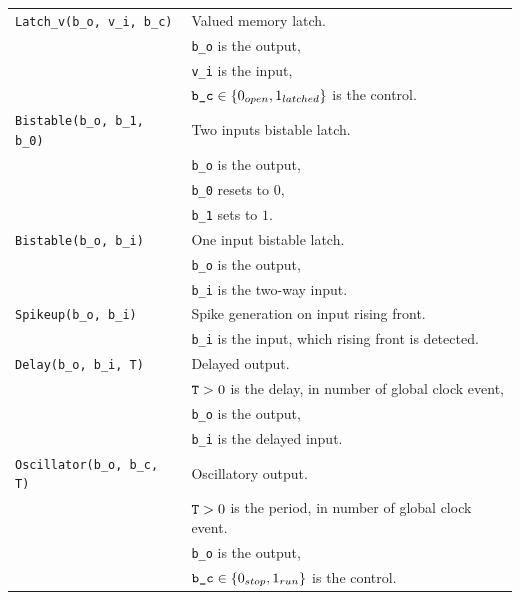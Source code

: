 \documentclass[a4]{article}
\begin{document}
{\begin{tabular}{ll}
  {\tt Latch\_v(b\_o, v\_i, b\_c)} & Valued memory latch. \\& {\tt b\_o} is the  output, \\& {\tt v\_i} is the input,  \\& $\mbox{{\tt b\_c}} \in \{0_{open}, 1_{latched}\}$ is the control. \\
  {\tt Bistable(b\_o, b\_1, b\_0)} & Two inputs bistable latch. \\& {\tt b\_o} is the  output, \\& {\tt b\_0} resets to $0$, \\& {\tt b\_1} sets to $1$. \\
  {\tt Bistable(b\_o, b\_i)} & One input bistable latch. \\& {\tt b\_o} is the  output, \\& {\tt b\_i} is the two-way input.\\
  {\tt Spikeup(b\_o, b\_i)} & Spike generation on input rising front. \\& {\tt b\_i} is the input, which rising front is detected.\\
  {\tt Delay(b\_o, b\_i, T)} & Delayed output. \\& $\mbox{{\tt T}} > 0$ is the delay, in number of global clock event, \\& {\tt b\_o} is the  output, \\& {\tt b\_i} is the delayed input.\\
  {\tt Oscillator(b\_o, b\_c, T)} & Oscillatory output. \\& $\mbox{{\tt T}} > 0$ is the period, in number of global clock event. \\& {\tt b\_o} is the  output, \\& $\mbox{{\tt b\_c}} \in \{0_{stop}, 1_{run}\}$ is the control.\\
\end{tabular}}





\end{document}
